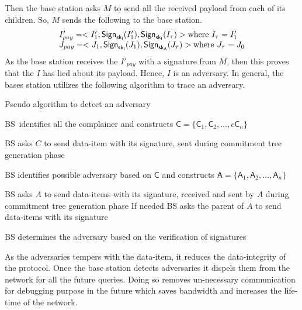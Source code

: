 		Then the base station asks $M$ to send all the received payload from each of its children.
		So, $M$ sends the following to the base station.
		\begin{equation*}
			\begin{array}{l}
				I'_{pay} = <I'_{1}, \textsf{Sign}_{\sf{sk}_{I}}(I'_{1}), \textsf{Sign}_{\sf{sk}_{I}}(I_{\tau})> \mbox{where}\ I_{\tau} = I'_{1}\\
				J_{pay} = <J_{1}, \textsf{Sign}_{\sf{sk}_{I}}(J_{1}), \textsf{Sign}_{\sf{sk}_{A}}(J_{\tau})> \mbox{where}\ J_{\tau} = J_{0}\\
			\end{array}
		\end{equation*}
		As the base station receives the $I'_{pay}$ with a signature from $M$, then this proves that the $I$ has lied about its payload.
		Hence, $I$ is an adversary.
		In general, the bases station utilizes the following algorithm to trace an adversary.
		\begin{algorithm}
			\caption{Pseudo algorithm to detect an adversary}
			\label{algo:detect-an-adversary}
			\begin{algorithmic}[1]

				\STATE BS\ identifies all the complainer and constructs $\textsf{C} = \{\textsf{C}_{1}, \textsf{C}_{2}, \dotsc, c\textsf{C}_{n}\}$

					\STATE BS asks $C$ to send data-item with its signature, sent during commitment tree generation phase
				
				\ENDFOR

				\STATE BS identifies possible adversary based on $\textsf{C}$ and constructs $\textsf{A} = \{\textsf{A}_{1},\textsf{A}_{2},\dotsc,\textsf{A}_{n}\}$


					\STATE BS asks $A$ to send data-items with its signature, received and sent by $A$ during commitment tree generation phase
					\STATE If needed BS  asks the parent of $A$ to send data-items with its signature
		
				\ENDFOR

				\STATE BS determines the adversary based on the verification of signatures

			\end{algorithmic}
		\end{algorithm}

		As the adversaries tempers with the data-item, it reduces the data-integrity of the protocol.
		Once the base station detects adversaries it dispels them from the network for all the future queries.
		Doing so removes un-necessary communication for debugging purpose in the future which saves bandwidth and increases the life-time of the network.

